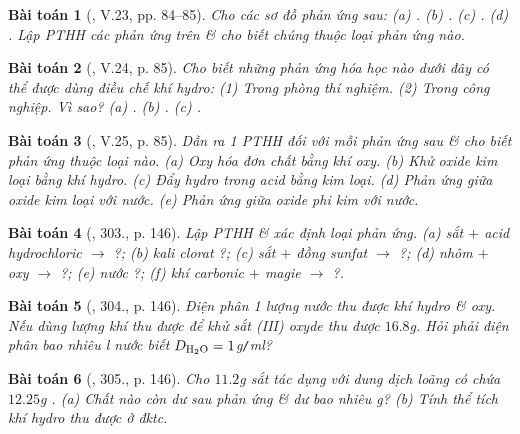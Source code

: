 \documentclass{article}
\newtheorem{baitoan}{Bài toán}
\begin{document}
\begin{baitoan}[\cite{Truong_BTNC_Hoa_Hoc_8_2022}, V.23, pp. 84--85]
	Cho các sơ đồ phản ứng sau: (a) \emph{}. (b) \emph{}. (c) \emph{}. (d) \emph{}. Lập PTHH các phản ứng trên \& cho biết chúng thuộc loại phản ứng nào.
\end{baitoan}

\begin{baitoan}[\cite{Truong_BTNC_Hoa_Hoc_8_2022}, V.24, p. 85]
	Cho biết những phản ứng hóa học nào dưới đây có thể được dùng điều chế khí hydro: (1) Trong phòng thí nghiệm. (2) Trong công nghiệp. Vì sao? (a) \emph{}. (b) \emph{}. (c) \emph{}.
\end{baitoan}

\begin{baitoan}[\cite{Truong_BTNC_Hoa_Hoc_8_2022}, V.25, p. 85]
	Dẫn ra 1 PTHH đối với mỗi phản ứng sau \& cho biết phản ứng thuộc loại nào. (a) Oxy hóa đơn chất bằng khí oxy. (b) Khử oxide kim loại bằng khí hydro. (c) Đẩy hydro trong acid bằng kim loại. (d) Phản ứng giữa oxide kim loại với nước. (e) Phản ứng giữa oxide phi kim với nước.
\end{baitoan}

\begin{baitoan}[\cite{An_400_BT_Hoa_Hoc_8_2020}, 303., p. 146]
	Lập PTHH \& xác định loại phản ứng. (a) sắt $+$ acid hydrochloric $\to$ ?; (b) kali clorat \ce{->[$t^\circ$]} ?; (c) sắt $+$ đồng sunfat $\to$ ?; (d) nhôm $+$ oxy $\to$ ?; (e) nước  ?; (f) khí carbonic $+$ magie $\to$ ?.
\end{baitoan}

\begin{baitoan}[\cite{An_400_BT_Hoa_Hoc_8_2020}, 304., p. 146]
	Điện phân 1 lượng nước thu được khí hydro \& oxy. Nếu dùng lượng khí \emph{} thu được để khử sắt (III) oxyde thu được $16.8$\emph{g}. Hỏi phải điện phân bao nhiêu \emph{l} nước biết $D_{\ce{H2O}} = 1$\emph{g\texttt{/}ml}?
\end{baitoan}

\begin{baitoan}[\cite{An_400_BT_Hoa_Hoc_8_2020}, 305., p. 146]
	Cho $11.2$\emph{g} sắt tác dụng với dung dịch \emph{} loãng có chứa $12.25$\emph{g }. (a) Chất nào còn dư sau phản ứng \& dư bao nhiêu \emph{g}? (b) Tính thể tích khí hydro thu được ở đktc.
\end{baitoan}
\end{document}
